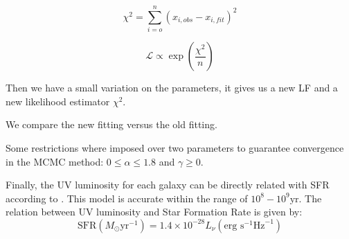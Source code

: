 \[ \chi^2  = \sum_{i=o}^{n}\left( x_{i,obs} - x_{i,fit} \right)^2 \]


\[ \mathcal{L} \propto \exp \left( \frac{\chi ^2}{n} \right) \]

Then we have a small variation on the parameters, it gives us a new LF and a new 
likelihood estimator $\chi^2$. 

We compare the new fitting versus the old fitting.



Some restrictions where imposed over two parameters to guarantee convergence in the 
MCMC method: $0 \leq \alpha \leq 1.8 $  and $\gamma \geq 0$.







Finally, the UV luminosity for each galaxy can be directly related with SFR according 
to \citet{madau98}.
This model is accurate within the range of $10^8 - 10^9 \textrm{yr}$\citep{kennicutt98}.
The relation between UV luminosity and Star Formation Rate \citep{madau98,kennicutt98} 
is given by:
\begin{equation}
 \textrm{SFR}\left(M_\odot \textrm{yr}^{-1}\right) 
      = 1.4 \times 10^{-28} L_{\nu} \left( \textrm{erg s}^{-1}\textrm{Hz}^{-1} 
	\right)
\end{equation}
